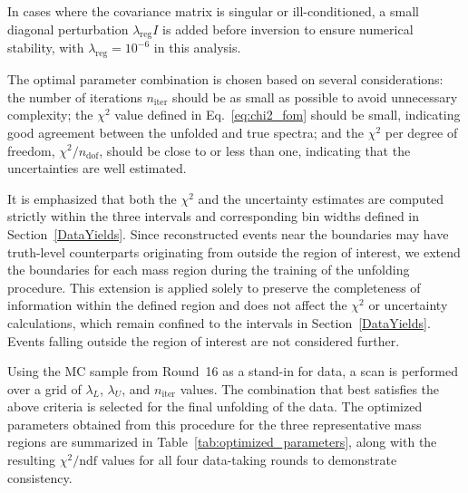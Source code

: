 In cases where the covariance matrix is singular or ill-conditioned, a small
diagonal perturbation $\lambda_{\text{reg}} I$ is added before inversion to
ensure numerical stability, with $\lambda_{\text{reg}} = 10^{-6}$ in this
analysis.

The optimal parameter combination is chosen based on several considerations:
the number of iterations $n_{\text{iter}}$ should be as small as possible to
avoid unnecessary complexity; the $\chi^2$ value defined in
Eq.~\eqref{eq:chi2_fom} should be small, indicating good agreement between the
unfolded and true spectra; and the $\chi^2$ per degree of freedom, $\chi^2 /
    n_{\text{dof}}$, should be close to or less than one, indicating that the
uncertainties are well estimated.

It is emphasized that both the $\chi^2$ and the uncertainty estimates are
computed strictly within the three intervals and corresponding bin widths
defined in Section~\ref{DataYields}. Since reconstructed events near the
boundaries may have truth-level counterparts originating from outside the
region of interest, we extend the boundaries for each mass region during the
training of the unfolding procedure. This extension is applied solely to
preserve the completeness of information within the defined region and does not
affect the $\chi^2$ or uncertainty calculations, which remain confined to the
intervals in Section~\ref{DataYields}. Events falling outside the region of
interest are not considered further.

Using the MC sample from Round~16 as a stand-in for data, a scan is performed
over a grid of $\lambda_L$, $\lambda_U$, and $n_{\text{iter}}$ values. The
combination that best satisfies the above criteria is selected for the final
unfolding of the data. The optimized parameters obtained from this procedure
for the three representative mass regions are summarized in
Table~\ref{tab:optimized_parameters}, along with the resulting
$\chi^2/\text{ndf}$ values for all four data-taking rounds to demonstrate
consistency.

